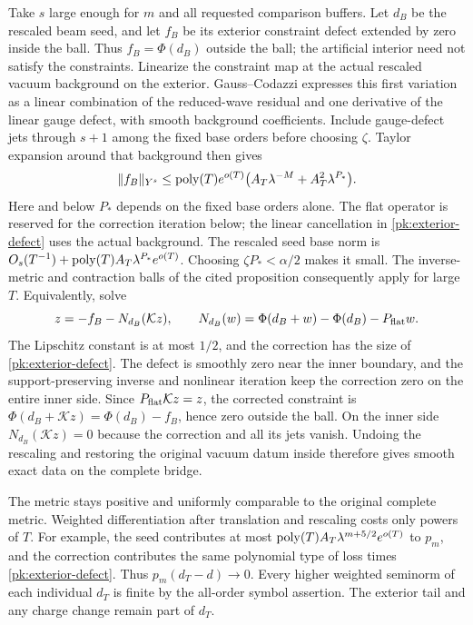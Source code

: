 Take $s$ large enough for $m$ and all requested comparison buffers.
Let $d_B$ be the rescaled beam seed, and let $f_B$ be its exterior
constraint defect extended by zero inside the ball. Thus $f_B=\Phi(d_B)$
outside the ball; the artificial interior need not satisfy the constraints.
Linearize the constraint map at the actual rescaled vacuum background
on the exterior. Gauss--Codazzi expresses this first variation as a
linear combination of the reduced-wave residual and one derivative
of the linear gauge defect, with smooth background coefficients.
Include gauge-defect jets through $s+1$ among the fixed base orders
before choosing $\zeta$. Taylor expansion around that background then gives
\begin{equation}\label{pk:exterior-defect}
 \|f_B\|_{Y^s}
 \le \operatorname{poly}(T)e^{o(T)}
      \bigl(A_T\lambda^{-M}+A_T^2\lambda^{P_*}\bigr).
\end{equation}
Here and below $P_*$ depends on the fixed base orders alone.
The flat operator is reserved for the correction iteration below;
the linear cancellation in \eqref{pk:exterior-defect} uses the actual
background.
The rescaled seed base norm is
$O_s(T^{-1})+\operatorname{poly}(T)A_T\lambda^{P_*}e^{o(T)}$.
Choosing $\zeta P_*<\alpha/2$ makes it small. The inverse-metric
and contraction balls of the cited proposition consequently
apply for large $T$. Equivalently, solve
\[
 z=-f_B-N_{d_B}(\mathcal Kz),\qquad
 N_{d_B}(w)=\Phi(d_B+w)-\Phi(d_B)-P_{\rm flat}w.
\]
The Lipschitz constant is at most $1/2$, and the correction has
the size of \eqref{pk:exterior-defect}. The defect is smoothly zero
near the inner boundary, and the support-preserving inverse and
nonlinear iteration keep the correction zero on the entire inner
side. Since $P_{\rm flat}\mathcal Kz=z$, the corrected constraint
is $\Phi(d_B+\mathcal Kz)=\Phi(d_B)-f_B$, hence zero outside the ball.
On the inner side $N_{d_B}(\mathcal Kz)=0$ because the correction and
all its jets vanish. Undoing the rescaling and restoring the original
vacuum datum inside therefore gives smooth exact data on the complete
bridge.

The metric stays positive and uniformly comparable to the original
complete metric. Weighted differentiation after translation and
rescaling costs only powers of $T$. For example, the seed contributes
at most $\operatorname{poly}(T)A_T\lambda^{m+5/2}e^{o(T)}$ to
$p_m$, and the correction contributes the same polynomial type of
loss times \eqref{pk:exterior-defect}. Thus $p_m(d_T-d)\to0$.
Every higher weighted seminorm of each individual $d_T$ is finite
by the all-order symbol assertion. The exterior tail and any charge
change remain part of $d_T$.

